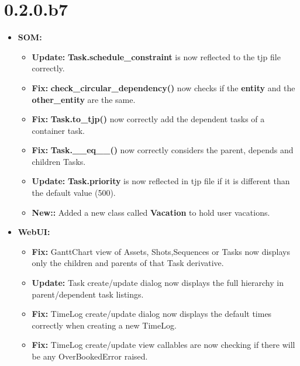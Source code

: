 \documentclass[a4paper,10pt,english]{sphinxmanual}
\begin{document}
\section{0.2.0.b7}
\label{changelog:b7}\begin{itemize}
\item {} 
\textbf{SOM:}
\begin{itemize}
\item {} 
\textbf{Update:} \textbf{Task.schedule\_constraint} is now reflected to the tjp file
correctly.

\item {} 
\textbf{Fix:} \textbf{check\_circular\_dependency()} now checks if the \textbf{entity} and
the \textbf{other\_entity} are the same.

\item {} 
\textbf{Fix:} \textbf{Task.to\_tjp()} now correctly add the dependent tasks of a
container task.

\item {} 
\textbf{Fix:} \textbf{Task.\_\_eq\_\_()} now correctly considers the parent, depends and
children Tasks.

\item {} 
\textbf{Update:} \textbf{Task.priority} is now reflected in tjp file if it is
different than the default value (500).

\item {} 
\textbf{New::} Added a new class called \textbf{Vacation} to hold user vacations.

\end{itemize}

\item {} 
\textbf{WebUI:}
\begin{itemize}
\item {} 
\textbf{Fix:} GanttChart  view of Assets, Shots,Sequences or Tasks now displays
only the children and parents of that Task derivative.

\item {} 
\textbf{Update:} Task create/update dialog now displays the full hierarchy in
parent/dependent task listings.

\item {} 
\textbf{Fix:} TimeLog create/update dialog now displays the default times
correctly when creating a new TimeLog.

\item {} 
\textbf{Fix:} TimeLog create/update view callables are now checking if there
will be any OverBookedError raised.


\end{itemize}
\end{itemize}
\end{document}
